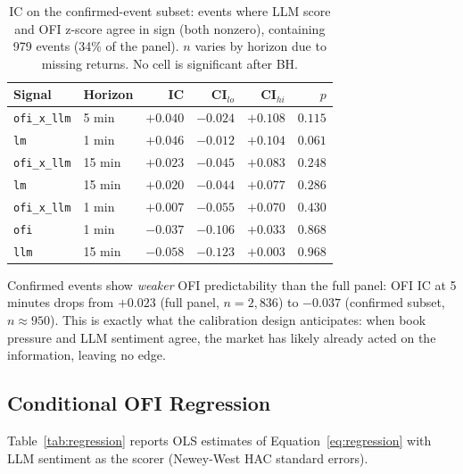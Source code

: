 \documentclass[11pt, letterpaper]{article}
\begin{document}
\begin{table}[h]
\centering
\small
\caption{IC on the confirmed-event subset: events where LLM score and OFI z-score
agree in sign (both nonzero), containing 979 events (34\% of the panel). $n$ varies
by horizon due to missing returns. No cell is significant after BH.}
\label{tab:ic_confirmed}
\begin{tabular}{llrrrr}
\toprule
Signal & Horizon & IC & CI$_{lo}$ & CI$_{hi}$ & $p$ \\
\midrule
\texttt{ofi\_x\_llm} & 5 min  & $+0.040$ & $-0.024$ & $+0.108$ & $0.115$ \\
\texttt{lm}          & 1 min  & $+0.046$ & $-0.012$ & $+0.104$ & $0.061$ \\
\texttt{ofi\_x\_llm} & 15 min & $+0.023$ & $-0.045$ & $+0.083$ & $0.248$ \\
\texttt{lm}          & 15 min & $+0.020$ & $-0.044$ & $+0.077$ & $0.286$ \\
\texttt{ofi\_x\_llm} & 1 min  & $+0.007$ & $-0.055$ & $+0.070$ & $0.430$ \\
\texttt{ofi}         & 1 min  & $-0.037$ & $-0.106$ & $+0.033$ & $0.868$ \\
\texttt{llm}         & 15 min & $-0.058$ & $-0.123$ & $+0.003$ & $0.968$ \\
\bottomrule
\end{tabular}
\end{table}

Confirmed events show \textit{weaker} OFI predictability than the full panel: OFI IC
at 5 minutes drops from $+0.023$ (full panel, $n = 2{,}836$) to $-0.037$ (confirmed
subset, $n \approx 950$). This is exactly what the calibration design anticipates:
when book pressure and LLM sentiment agree, the market has likely already acted on
the information, leaving no edge.

\subsection{Conditional OFI Regression}

Table~\ref{tab:regression} reports OLS estimates of Equation~\ref{eq:regression}
with LLM sentiment as the scorer (Newey-West HAC standard errors).
\end{document}
